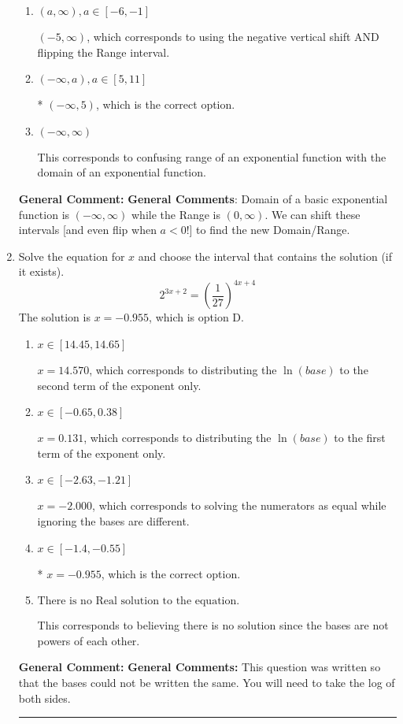 \documentclass{extbook}[14pt]
\newcommand{\litem}[1]{\item #1

\rule{\textwidth}{0.4pt}}
\begin{document}
\begin{enumerate}
{\begin{enumerate}[label=\Alph*.]
$(-\infty, 5]$, which corresponds to including the endpoint.
\item \( (a, \infty), a \in [-6, -1] \)

$(-5, \infty)$, which corresponds to using the negative vertical shift AND flipping the Range interval.
\item \( (-\infty, a), a \in [5, 11] \)

* $(-\infty, 5)$, which is the correct option.
\item \( (-\infty, \infty) \)

This corresponds to confusing range of an exponential function with the domain of an exponential function.
\end{enumerate}

\textbf{General Comment:} \textbf{General Comments}: Domain of a basic exponential function is $(-\infty, \infty)$ while the Range is $(0, \infty)$. We can shift these intervals [and even flip when $a<0$!] to find the new Domain/Range.
}
\litem{
Solve the equation for $x$ and choose the interval that contains the solution (if it exists).
\[ 2^{3x+2} = \left(\frac{1}{27}\right)^{4x+4} \]The solution is \( x = -0.955 \), which is option D.\begin{enumerate}[label=\Alph*.]
\item \( x \in [14.45, 14.65] \)

$x = 14.570$, which corresponds to distributing the $\ln(base)$ to the second term of the exponent only.
\item \( x \in [-0.65, 0.38] \)

$x = 0.131$, which corresponds to distributing the $\ln(base)$ to the first term of the exponent only.
\item \( x \in [-2.63, -1.21] \)

$x = -2.000$, which corresponds to solving the numerators as equal while ignoring the bases are different.
\item \( x \in [-1.4, -0.55] \)

* $x = -0.955$, which is the correct option.
\item \( \text{There is no Real solution to the equation.} \)

This corresponds to believing there is no solution since the bases are not powers of each other.
\end{enumerate}

\textbf{General Comment:} \textbf{General Comments:} This question was written so that the bases could not be written the same. You will need to take the log of both sides.
}
\end{enumerate}
\end{document}
